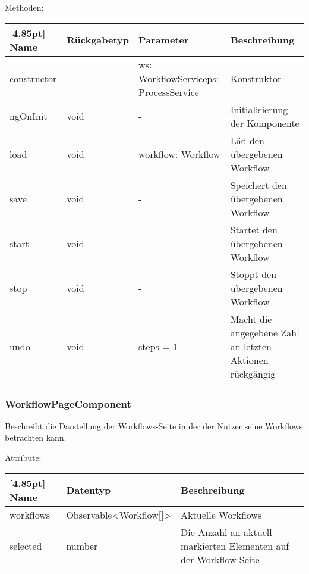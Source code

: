 			Methoden:
			\begin{center}
			\setlength\tabcolsep{5pt}
				\renewcommand{\arraystretch}{1.5}
					\begin{tabularx}{\textwidth}{|l|l|p{38mm}|X|}
					\hline
					\rowcolor[gray]{0.75}[4.85pt]
					Name & Rückgabetyp & Parameter & Beschreibung \\ \hline
					constructor& - & ws: WorkflowService\newline ps: ProcessService & Konstruktor \\ \hline
					ngOnInit & void & - & Initialisierung der Komponente \\ \hline
					load & void & workflow: Workflow & Läd den übergebenen Workflow \\ \hline
					save & void & - & Speichert den übergebenen Workflow \\ \hline
					start & void & - & Startet den übergebenen Workflow \\ \hline
					stop & void & - & Stoppt den übergebenen Workflow \\ \hline
					undo & void & steps = 1 & Macht die angegebene Zahl an letzten Aktionen rückgängig \\ \hline
					\end{tabularx}
			\end{center}
			
			\subsubsection{WorkflowPageComponent}
			
			Beschreibt die Darstellung der Workflows-Seite in der der Nutzer seine Workflows betrachten kann.\newline
			
			Attribute:
			\begin{center}
				\renewcommand{\arraystretch}{1.5}
				\setlength\tabcolsep{5pt}
				\begin{tabularx}{\textwidth}{|l|l|X|}
					\hline
					\rowcolor[gray]{0.75}[4.85pt]					
					Name & Datentyp & Beschreibung \\ \hline
					workflows & Observable<Workflow[]> & Aktuelle Workflows \\ \hline
					selected & number & Die Anzahl an aktuell markierten Elementen auf der Workflow-Seite \\ \hline
				\end{tabularx}
			\end{center}
				
